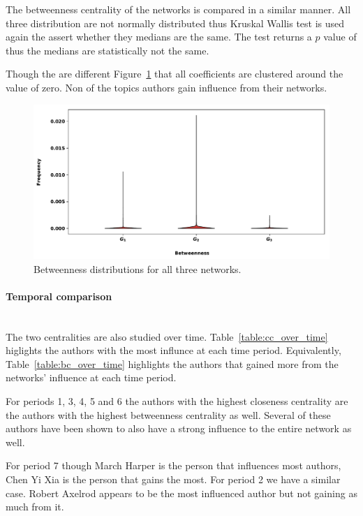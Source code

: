 \documentclass{article}
\theoremstyle{definition}
\begin{document}
The betweenness centrality of the networks is compared in a similar manner.
All three distribution are not normally distributed thus Kruskal Wallis test
is used again the assert whether they medians are the same. The test returns
a \(p\) value of  thus the medians are statistically not the same.

Though the are different Figure~\ref{fig:closeness_dist} that all coefficients
are clustered around the value of zero. Non of the topics authors gain influence
from their networks.

\begin{figure}[!hbtp]
    \centering
    \includegraphics[width=.8\textwidth]{./assets/images/Betweenness_histrograms.pdf}
    \caption{Betweenness distributions for all three networks.}\label{fig:closeness_dist}
\end{figure}

\paragraph{Temporal comparison}
\mbox{ }\\

The two centralities are also studied over time. Table~\ref{table:cc_over_time} higlights
the authors with the most influnce at each time period. Equivalently, Table~\ref{table:bc_over_time}
highlights the authors that gained more from the networks' influence at each
time period.

For periods 1, 3, 4, 5 and 6 the authors with the highest closeness centrality
are the authors with the highest betweenness centrality as well. Several of these
authors have been shown to also have a strong influence to the entire network
as well.

For period 7 though March Harper is the person that influences most authors,
Chen Yi Xia is the person that gains the most. For period 2 we have a similar
case. Robert Axelrod appears to be the most influenced author but not gaining 
as much from it.
\end{document}
